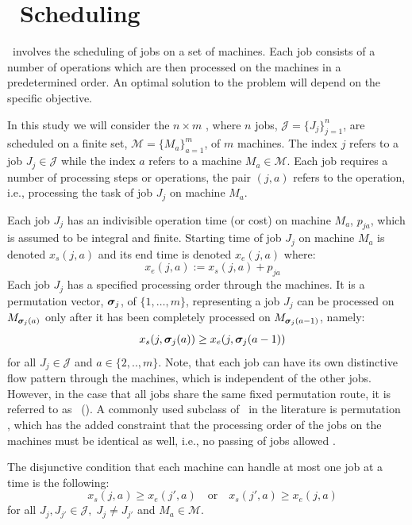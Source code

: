 \documentclass[twocolumn]{svjour3}
\begin{document}
\section{\Jsp~Scheduling}\label{sec:problemdef}
\JSP\ involves the scheduling of jobs on a set of 
machines. Each job consists of a number of operations which are then processed 
on the machines in a predetermined order. An optimal solution to the problem 
will depend on the specific objective. 

In this study we will consider the $n\times m$ \JSP, where $n$ jobs, 
$\mathcal{J}=\{J_j\}_{j=1}^n$, are scheduled on a finite set, 
$\mathcal{M}=\{M_a\}_{a=1}^m$, of $m$ machines. The index $j$ refers to a job 
$J_j\in\mathcal{J}$ while the index $a$ refers to a machine 
$M_a\in\mathcal{M}$. 
Each job requires a number of processing steps or operations, the pair 
$(j,a)$ refers to the operation, i.e., processing the task of job $J_j$ on 
machine $M_a$. 

Each job $J_j$ has an indivisible operation time (or cost) on machine $M_a$, 
$p_{ja}$, which is assumed to be integral and finite. 
Starting time of job $J_j$ on machine $M_a$ is denoted $x_s(j,a)$ and its 
end time is denoted $x_e(j,a)$ where:
\begin{equation}\quad x_e(j,a):=x_s(j,a)+p_{ja} \end{equation} 
Each job $J_j$ has a specified processing order through the machines. It is a 
permutation vector, $\bm \sigma_j$, of $\{1,\ldots,m\}$, representing a job $J_j$ 
can be processed on $M_{\bm \sigma_j(a)}$ only after it has been completely 
processed on $M_{\bm \sigma_j(a-1)}$, namely:
\begin{equation}\quad\label{eq:permutation}
x_s(j,\bm \sigma_j(a)) \geq x_e(j,\bm \sigma_j(a-1)) 
\end{equation}
for all $J_j\in\mathcal{J}$ and $a\in\{2,..,m\}$. 
Note, that each job can have its own distinctive flow pattern through the 
machines, which is independent of the other jobs. 
However, in the case that all jobs share the same fixed permutation 
route, it is referred to as \fsp~(\FSP). 
A commonly used subclass of \FSP\ in the literature is permutation \fsp, which 
has the added constraint that the processing order of the jobs on the machines 
must be identical as well, i.e., no passing of jobs allowed \cite{Stafford88}.

The disjunctive condition that each machine can handle at most one job at a 
time is the following:
\begin{equation}\quad\label{eq:oneJobPerMac}
x_s(j,a) \geq x_e(j',a) \quad\textrm{or}\quad x_s(j',a) \geq x_e(j,a) 
\end{equation}
for all $J_j,J_{j'}\in\mathcal{J},\; J_j\neq J_{j'}$ and $M_a\in\mathcal{M}$. 
\end{document}
